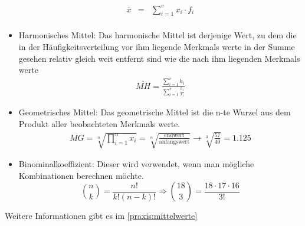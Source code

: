\begin{itemize}
\begin{eqnarray}
	\overline{x}&=&\sum_{i=1}^{v}x_i\cdot f_i\\
	\end{eqnarray}
	\item Harmonisches Mittel: Das harmonische Mittel ist derjenige Wert, zu dem die in der Häufigkeitsverteilung vor ihm liegende Merkmals werte in der Summe gesehen relativ gleich weit entfernt sind wie die nach ihm liegenden Merkmals werte
	\begin{eqnarray}\label{theorie:mittelwerte:harmo}
	\overline{MH}=\frac{\sum_{i=1}^{v}h_i}{\sum_{i=1}^{v}\frac{h_i}{x_i}}
	\end{eqnarray}
	\item Geometrisches Mittel: Das geometrische Mittel ist die n-te Wurzel aus dem Produkt aller beobachteten Merkmals werte.%
	\begin{eqnarray}\label{theorie:mittelwert:geome}
	MG=\sqrt[n]{\prod_{i=1}^{n}x_i}=\sqrt[n]{\frac{\mbox{endwert}}{\mbox{anfangswert}}}\longrightarrow \sqrt[3]{\frac{57}{40}}=1.125
	\end{eqnarray}
	\item Binominalkoeffizient: Dieser wird verwendet, wenn man mögliche Kombinationen berechnen möchte. 
    \begin{equation}
    {n \choose k} = \frac{n!}{k!(n-k)!} \Rightarrow {18 \choose 3} = \frac{18\cdot17\cdot16}{3!}
    \end{equation}
\end{itemize}
Weitere Informationen gibt es im \autoref{praxis:mittelwerte}
